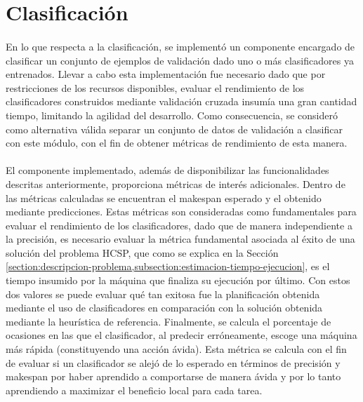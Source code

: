 \newpage %

\section{Clasificación} \label{chapter-implementacion:clasificacion}

\paragraph{} En lo que respecta a la clasificación, se implementó un componente encargado de clasificar un conjunto de ejemplos de validación dado uno o más clasificadores ya entrenados.
Llevar a cabo esta implementación fue necesario dado que por restricciones de los recursos disponibles, evaluar el rendimiento de los clasificadores construidos mediante validación cruzada insumía una gran cantidad tiempo, limitando la agilidad del desarrollo.
Como consecuencia, se consideró como alternativa válida separar un conjunto de datos de validación a clasificar con este módulo, con el fin de obtener métricas de rendimiento de esta manera. 

\paragraph{} El componente implementado, además de disponibilizar las funcionalidades descritas anteriormente, proporciona métricas de interés adicionales.
Dentro de las métricas calculadas se encuentran el makespan esperado y el obtenido mediante predicciones.
Estas métricas son consideradas como fundamentales para evaluar el rendimiento de los clasificadores, dado que de manera independiente a la precisión, es necesario evaluar la métrica fundamental asociada al éxito de una solución del problema HCSP, que como se explica en la Sección \ref{section:descripcion-problema,subsection:estimacion-tiempo-ejecucion}, es el tiempo insumido por la máquina que finaliza su ejecución por último.
Con estos dos valores se puede evaluar qué tan exitosa fue la planificación obtenida mediante el uso de clasificadores en comparación con la solución obtenida mediante la heurística de referencia.
Finalmente, se calcula el porcentaje de ocasiones en las que el clasificador, al predecir erróneamente, escoge una máquina más rápida (constituyendo una acción ávida).
Esta métrica se calcula con el fin de evaluar si un clasificador se alejó de lo esperado en términos de precisión y makespan por haber aprendido a comportarse de manera ávida y por lo tanto aprendiendo a maximizar el beneficio local para cada tarea.

